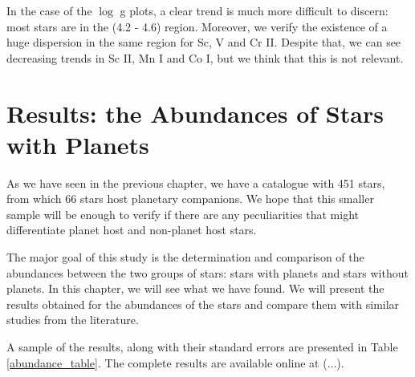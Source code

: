 \documentclass[dvips,12pt,a4paper]{report}
\begin{document}
{{In the case of the $\log$ g plots, a clear trend is much more difficult to discern: most stars are in the (4.2 - 4.6) region. Moreover, we verify the existence of a huge dispersion in the same region for Sc, V and Cr II. Despite that, we can see decreasing trends in Sc II, Mn I and Co I, but we think that this is not relevant. 


\chapter{Results: the Abundances of Stars with Planets}

As we have seen in the previous chapter, we have a catalogue with 451 stars, from which 66 stars host planetary companions. We hope that this smaller sample will be enough to verify if there are any peculiarities that might differentiate planet host and non-planet host stars. 

The major goal of this study is the determination and comparison of the abundances between the two groups of stars: stars with planets and stars without planets. In this chapter, we will see what we have found. We will present the results obtained for the abundances of the stars and compare them with similar studies from the literature.

A sample of the results, along with their standard errors are presented in Table \ref{abundance_table}. The complete results are available online at (...). 



}}
\end{document}
